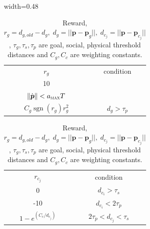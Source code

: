 \documentclass[letterpaper,conference,10pt]{IEEEconf}
\DeclareMathOperator{\sign}{sign}
\DeclareMathOperator{\sgn}{sgn}
\begin{document}
\begin{table}[ht]
    \vspace{-0.2cm}
    \centering
    \caption{Reward, $r_g=d_{g,old}-d_g, \; d_g=\vert\vert\boldsymbol{p}-\boldsymbol{p}_g\vert\vert, \; d_{c_j}=\vert\vert \boldsymbol{p} - \boldsymbol{p}_{c_j}\vert\vert$, $\tau_g, \tau_s, \tau_p$ are goal, social, physical threshold distances and $C_g,C_c$ are weighting constants.}
    \label{tab:rew}
    \begin{adjustbox}{width=0.48\textwidth}
        \begin{tabular}{ | c | c | }
        \hline
            $r_g$ & condition \\
        \Xhline{2\arrayrulewidth}
            10 & \makecell{$d_g < \tau_p \land $ \\ \vspace{1.15mm} $\|\dot{\boldsymbol{p}}\| < a_{\textsc{max}}T$}\\
        \hline
            $C_g \sgn(r_g)r_g^2$ & $d_g > \tau_p$\\
        \hline
        \end{tabular}
        \begin{tabular}{ | c | c | }
        \hline
            $r_{c_j}$ & condition \\
        \Xhline{2\arrayrulewidth}
            0 & $d_{c_i}>\tau_s$\\
        \hline
            -10 & $d_{c_i}<2\tau_p$\\
        \hline
            $1 - e^{(C_c/d_{c_j})}$ & $2\tau_p<d_{c_j}<\tau_s$\\
        \hline
        \end{tabular}
    \end{adjustbox}
    \vspace{-0.3cm}
\end{table}
\end{document}
